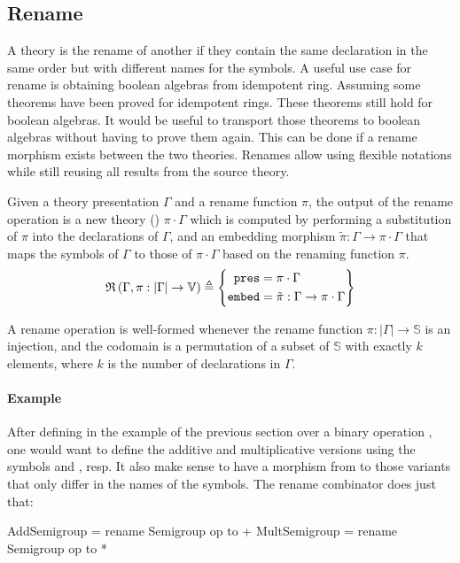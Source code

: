 \subsection{Rename}
\label{subsec:rename}
A theory is the rename of another if they contain the same declaration in the same order but with different names for the symbols. A useful use case for rename is obtaining boolean algebras from idempotent ring. Assuming some theorems have been proved for idempotent rings. These theorems still hold for boolean algebras. It would be useful to transport those theorems to boolean algebras without having to prove them again. This can be done if a rename morphism exists between the two theories. Renames allow using flexible notations while still reusing all results from the source theory. 

Given a theory presentation $\Gamma$ and a rename function $\pi$, the output of the rename operation is a new theory () $\pi \cdot \Gamma$ which is computed by performing a substitution of $\pi$ into the declarations of $\Gamma$, and an embedding morphism $\tilde{\pi} : \Gamma \to \pi\cdot\Gamma$ that maps the symbols of $\Gamma$ to those of $\pi\cdot\Gamma$ based on the renaming function $\pi$. 
\[ \mathfrak{R}\left(\Gamma, \pi : \left| \Gamma \right| \rightarrow \mathbb{V}\right) \triangleq \left\{\begin{aligned} \mathtt{pres} & = \pi \cdot \Gamma \\ \mathtt{embed} & = \tilde{\pi}:\Gamma \rightarrow \pi\cdot\Gamma \end{aligned}\right\} \]

A rename operation is well-formed whenever the rename function $\pi : |\Gamma| \to \mathbb{S}$ is an injection, and the codomain is a permutation of a subset of $\mathbb{S}$ with exactly $k$ elements, where $k$ is the number of declarations in $\Gamma$. 

\paragraph{Example}
After defining  in the example of the previous section over a binary operation , one would want to define the additive and multiplicative versions using the symbols \lstmath{+} and \lstmath{*}, resp. It also make sense to have a morphism from  to those variants that only differ in the names of the symbols. The rename combinator does just that: 
\begin{togcode}
AddSemigroup  = rename Semigroup {op to +} 
MultSemigroup = rename Semigroup {op to *} 
\end{togcode}  

